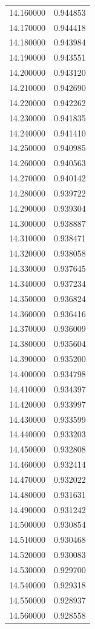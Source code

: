 \begin{tabular}{rr}
14.160000 & 0.944853 \\
14.170000 & 0.944418 \\
14.180000 & 0.943984 \\
14.190000 & 0.943551 \\
14.200000 & 0.943120 \\
14.210000 & 0.942690 \\
14.220000 & 0.942262 \\
14.230000 & 0.941835 \\
14.240000 & 0.941410 \\
14.250000 & 0.940985 \\
14.260000 & 0.940563 \\
14.270000 & 0.940142 \\
14.280000 & 0.939722 \\
14.290000 & 0.939304 \\
14.300000 & 0.938887 \\
14.310000 & 0.938471 \\
14.320000 & 0.938058 \\
14.330000 & 0.937645 \\
14.340000 & 0.937234 \\
14.350000 & 0.936824 \\
14.360000 & 0.936416 \\
14.370000 & 0.936009 \\
14.380000 & 0.935604 \\
14.390000 & 0.935200 \\
14.400000 & 0.934798 \\
14.410000 & 0.934397 \\
14.420000 & 0.933997 \\
14.430000 & 0.933599 \\
14.440000 & 0.933203 \\
14.450000 & 0.932808 \\
14.460000 & 0.932414 \\
14.470000 & 0.932022 \\
14.480000 & 0.931631 \\
14.490000 & 0.931242 \\
14.500000 & 0.930854 \\
14.510000 & 0.930468 \\
14.520000 & 0.930083 \\
14.530000 & 0.929700 \\
14.540000 & 0.929318 \\
14.550000 & 0.928937 \\
14.560000 & 0.928558 \\

\end{tabular}
